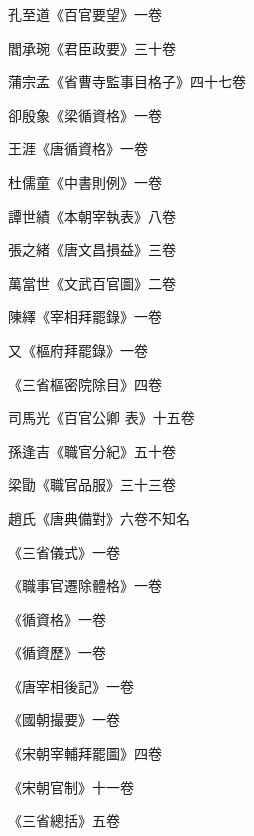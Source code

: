 \begin{pinyinscope}
 孔至道《百官要望》一卷



 閻承琬《君臣政要》三十卷



 蒲宗孟《省曹寺監事目格子》四十七卷



 卻殷象《梁循資格》一卷



 王涯《唐循資格》一卷



 杜儒童《中書則例》一卷



 譚世績《本朝宰執表》八卷



 張之緒《唐文昌損益》三卷



 萬當世《文武百官圖》二卷



 陳繹《宰相拜罷錄》一卷



 又《樞府拜罷錄》一卷



 《三省樞密院除目》四卷



 司馬光《百官公卿
 表》十五卷



 孫逢吉《職官分紀》五十卷



 梁勖《職官品服》三十三卷



 趙氏《唐典備對》六卷不知名



 《三省儀式》一卷



 《職事官遷除體格》一卷



 《循資格》一卷



 《循資歷》一卷



 《唐宰相後記》一卷



 《國朝撮要》一卷



 《宋朝宰輔拜罷圖》四卷



 《宋朝官制》十一卷



 《三省總括》五卷




\end{pinyinscope}
